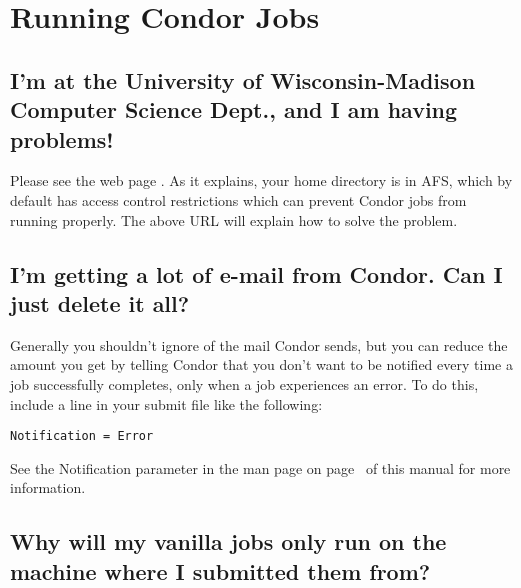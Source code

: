 \section{Running Condor Jobs}

\subsection*{I'm at the University of Wisconsin-Madison Computer Science Dept., and I am having problems!}

Please see the web page .
As
it explains, your home directory is in AFS, which by default has
access control restrictions which can prevent Condor jobs from running
properly.
The above URL will explain how to solve the problem.

\subsection*{I'm getting a lot of e-mail from Condor.  Can I just delete it all?}

Generally you shouldn't ignore  of the mail Condor sends,
but you can reduce the amount you get by telling Condor that you don't
want to be notified every time a job successfully completes, only when
a job experiences an error.
To do this, include a line in your submit file like the following:

\begin{verbatim}
Notification = Error
\end{verbatim}

See the Notification parameter in the  man page on
page~\pageref{man-condor-submit-notification} of this manual for more
information.

\subsection*{Why will my vanilla jobs only run on the machine where I submitted them from?}

